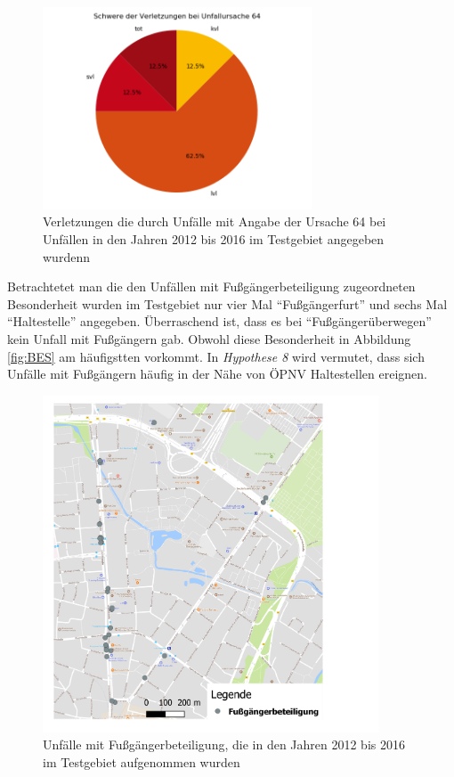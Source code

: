 \begin{savenotes}
	\begin{figure}[H]
		\centering
		\includegraphics[width=8cm,height=6cm]{figures/Urs64}
		\caption[Verletzungen die durch Unfälle mit Angabe der Ursache 64 bei Unfällen in den Jahren 2012 bis 2016 im Testgebiet angegeben wurden]{Verletzungen die durch Unfälle mit Angabe der Ursache 64 bei Unfällen in den Jahren 2012 bis 2016 im Testgebiet angegeben wurdenn}\label{fig:Verletzungen_Urs64}
	\end{figure}
\end{savenotes}


Betrachtetet man die den Unfällen mit Fußgängerbeteiligung zugeordneten Besonderheit wurden im Testgebiet nur vier Mal \enquote{Fußgängerfurt} und sechs Mal \enquote{Haltestelle} angegeben. Überraschend ist, dass es bei \enquote{Fußgängerüberwegen} kein Unfall mit Fußgängern gab. Obwohl diese Besonderheit in Abbildung \ref{fig:BES} am häufigstten vorkommt. In \textit{Hypothese 8} wird vermutet, dass sich Unfälle mit Fußgängern häufig in der Nähe von ÖPNV Haltestellen ereignen.

\begin{savenotes}
	\begin{figure}[H]
		\centering
		\includegraphics[width=10cm,height=10cm]{figures/map_fussgaenger}
		\caption[Unfälle mit Fußgängerbeteiligung, die in den Jahren 2012 bis 2016 im Testgebiet aufgenommen wurden]{Unfälle mit Fußgängerbeteiligung, die in den Jahren 2012 bis 2016 im Testgebiet aufgenommen wurden}\label{fig:map_fussganeger}
	\end{figure}
\end{savenotes}

